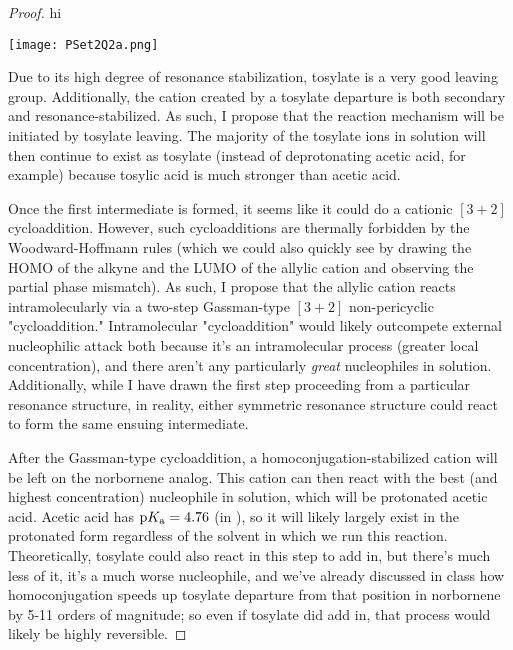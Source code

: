 \documentclass[../psets.tex]{subfiles}
\begin{document}
\begin{enumerate}
\begin{enumerate}
\begin{proof}



            {\color{white}hi}
            \begin{center}
                \texttt{[image: PSet2Q2a.png]}
            \end{center}
            Due to its high degree of resonance stabilization, tosylate is a very good leaving group. Additionally, the cation created by a tosylate departure is both secondary and resonance-stabilized. As such, I propose that the reaction mechanism will be initiated by tosylate leaving. The majority of the tosylate ions in solution will then continue to exist as tosylate (instead of deprotonating acetic acid, for example) because tosylic acid is much stronger than acetic acid.\par
            Once the first intermediate is formed, it seems like it could do a cationic $[3+2]$ cycloaddition. However, such cycloadditions are thermally forbidden by the Woodward-Hoffmann rules (which we could also quickly see by drawing the HOMO of the alkyne and the LUMO of the allylic cation and observing the partial phase mismatch). As such, I propose that the allylic cation reacts intramolecularly via a two-step Gassman-type $[3+2]$ non-pericyclic "cycloaddition." Intramolecular "cycloaddition" would likely outcompete external nucleophilic attack both because it's an intramolecular process (greater local concentration), and there aren't any particularly \emph{great} nucleophiles in solution. Additionally, while I have drawn the first step proceeding from a particular resonance structure, in reality, either symmetric resonance structure could react to form the same ensuing intermediate.\par
            After the Gassman-type cycloaddition, a homoconjugation-stabilized cation will be left on the norbornene analog. This cation can then react with the best (and highest concentration) nucleophile in solution, which will be protonated acetic acid. Acetic acid has $\textup{p}K_\textup{a}=4.76$ (in ), so it will likely largely exist in the protonated form regardless of the solvent in which we run this reaction. Theoretically, tosylate could also react in this step to add in, but there's much less of it, it's a much worse nucleophile, and we've already discussed in class how homoconjugation speeds up tosylate departure from that position in norbornene by 5-11 orders of magnitude; so even if tosylate did add in, that process would likely be highly reversible.\par

\end{proof}
\end{enumerate}
\end{enumerate}
\end{document}
